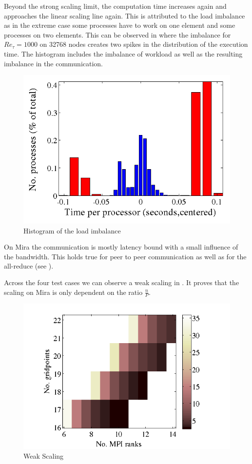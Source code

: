 \documentclass{sig-alternate}
\begin{document}
Beyond the strong scaling limit, the computation time increases again and
approaches the linear scaling line again. This is attributed to the load
imbalance as in the extreme case some processes have to work on one element and
some processes on two elements. This can be observed in
where the imbalance for $Re_{\tau}=1000$ on 32768 nodes creates two spikes in the
distribution of the execution time. The histogram includes the imbalance of
workload as well as the resulting imbalance in the communication.
\begin{figure}
  \centering
  \includegraphics[width=\linewidth]{./figures/histogram.png}
  \caption{Histogram of the load imbalance}
  \label{fig:imbalancehist}
\end{figure}


On Mira the communication is mostly latency bound with a small influence of the
bandwidth. This holds true for peer to peer communication as well as for the
all-reduce (see ).

Across the four test cases we can observe a weak scaling in
. It proves that the scaling on Mira is only dependent
on the ratio $\frac{n}{P}$. 
\begin{figure}
  \centering
  \includegraphics[width=\linewidth]{./figures/weak.png}
  \caption{Weak Scaling}
  \label{fig:weakscaling}
\end{figure}
\end{document}
